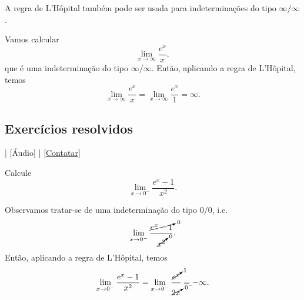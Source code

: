 \begin{obs}
  A regra de L'Hôpital também pode ser usada para indeterminações do tipo $\infty/\infty$.
\end{obs}

\begin{ex}
  Vamos calcular
  \begin{equation}
    \lim_{x\to \infty} \frac{e^x}{x},
  \end{equation}
  que é uma indeterminação do tipo $\infty/\infty$. Então, aplicando a regra de L'Hôpital, temos
  \begin{equation}
    \lim_{x\to \infty} \frac{e^x}{x} = \lim_{x\to \infty} \frac{e^x}{1} = \infty.
  \end{equation}
\end{ex}

\subsection*{Exercícios resolvidos}

\begin{flushright}
  [Vídeo] | [Áudio] | \href{https://phkonzen.github.io/notas/contato.html}{[Contatar]}
\end{flushright}

\begin{exeresol}
  Calcule
  \begin{equation}
    \lim_{x\to 0^-} \frac{e^x-1}{x^2}.
  \end{equation}
\end{exeresol}
\begin{resol}
  Observamos tratar-se de uma indeterminação do tipo $0/0$, i.e.
  \begin{equation}
    \lim_{x\to 0^-} \frac{\cancelto{0}{e^x-1}}{\cancelto{0}{x^2}}.
  \end{equation}
  Então, aplicando a regra de L'Hôpital, temos
  \begin{equation}
    \lim_{x\to 0^-} \frac{e^x-1}{x^2} = \lim_{x\to 0^-} \frac{\cancelto{1}{e^x}}{\cancelto{0^-}{2x}} = -\infty.
  \end{equation}
\end{resol}

